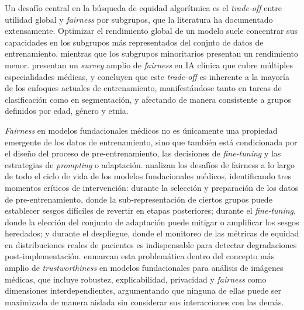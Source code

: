 Un desafío central en la búsqueda de equidad algorítmica es el \textit{trade-off} entre utilidad global y \textit{fairness}
por subgrupos, que la literatura ha documentado extensamente. Optimizar el rendimiento global de un modelo suele 
concentrar sus capacidades en los subgrupos más representados del conjnto de datos de entrenamiento, mientras que los 
subgrupos minoritarios presentan un rendimiento menor. \citeauthor{kashif2025} presentan un \textit{survey} amplio de 
\textit{fairness} en IA clínica que cubre múltiples especialidades médicas, y concluyen que este \textit{trade-off} es 
inherente a la mayoría de los enfoques actuales de entrenamiento, manifestándose tanto en tareas de clasificación 
como en segmentación, y afectando de manera consistente a grupos definidos por edad, género y etnia. 

\textit{Fairness} en modelos fundacionales médicos no es únicamente una propiedad emergente de los datos de entrenamiento, 
sino que también está condicionada por el diseño del proceso de pre-entrenamiento, las decisiones de \textit{fine-tuning} y 
las estrategias de \textit{prompting} o adaptación. \citeauthor{queiroz2026} analizan los desafíos de fairness a lo largo de 
todo el ciclo de vida de los modelos fundacionales médicos, identificando tres momentos críticos de intervención: 
durante la selección y preparación de los datos de pre-entrenamiento, donde la sub-representación de ciertos grupos puede establecer 
sesgos difíciles de revertir en etapas posteriores; durante el \textit{fine-tuning}, donde la elección del conjunto de 
adaptación puede mitigar o amplificar los sesgos heredados; y durante el despliegue, donde el monitoreo de las 
métricas de equidad en distribuciones reales de pacientes es indispensable para detectar degradaciones post-implementación. 
\citeauthor{shi2024} enmarcan esta problemática dentro del concepto más amplio de 
\textit{trustworthiness} en modelos fundacionales para análisis de imágenes médicas, que incluye robustez, 
explicabilidad, privacidad y \textit{fairness} como dimensiones interdependientes, argumentando que ninguna de ellas puede 
ser maximizada de manera aislada sin considerar sus interacciones con las demás.

